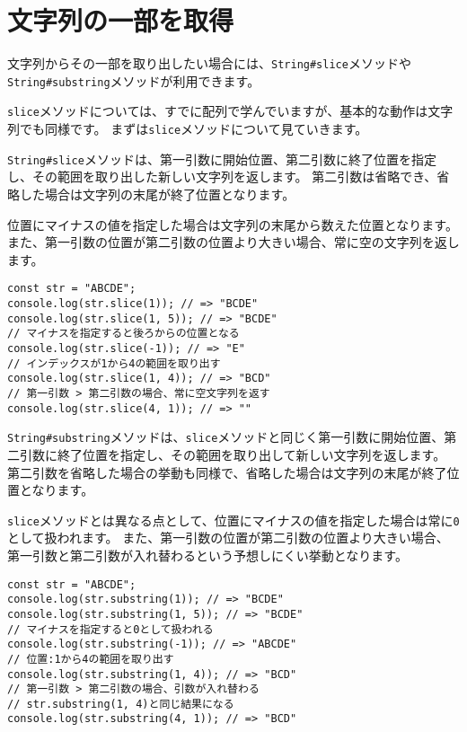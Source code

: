 \hypertarget{slice}{%
\section{文字列の一部を取得}\label{slice}}

文字列からその一部を取り出したい場合には、\texttt{String\#slice}メソッドや\texttt{String\#substring}メソッドが利用できます。

\texttt{slice}メソッドについては、すでに配列で学んでいますが、基本的な動作は文字列でも同様です。
まずは\texttt{slice}メソッドについて見ていきます。

\texttt{String\#slice}メソッドは、第一引数に開始位置、第二引数に終了位置を指定し、その範囲を取り出した新しい文字列を返します。
第二引数は省略でき、省略した場合は文字列の末尾が終了位置となります。

位置にマイナスの値を指定した場合は文字列の末尾から数えた位置となります。
また、第一引数の位置が第二引数の位置より大きい場合、常に空の文字列を返します。

\begin{lstlisting}
const str = "ABCDE";
console.log(str.slice(1)); // => "BCDE"
console.log(str.slice(1, 5)); // => "BCDE"
// マイナスを指定すると後ろからの位置となる
console.log(str.slice(-1)); // => "E"
// インデックスが1から4の範囲を取り出す
console.log(str.slice(1, 4)); // => "BCD"
// 第一引数 > 第二引数の場合、常に空文字列を返す
console.log(str.slice(4, 1)); // => ""
\end{lstlisting}

\texttt{String\#substring}メソッドは、\texttt{slice}メソッドと同じく第一引数に開始位置、第二引数に終了位置を指定し、その範囲を取り出して新しい文字列を返します。
第二引数を省略した場合の挙動も同様で、省略した場合は文字列の末尾が終了位置となります。

\texttt{slice}メソッドとは異なる点として、位置にマイナスの値を指定した場合は常に\texttt{0}として扱われます。
また、第一引数の位置が第二引数の位置より大きい場合、第一引数と第二引数が入れ替わるという予想しにくい挙動となります。

\begin{lstlisting}
const str = "ABCDE";
console.log(str.substring(1)); // => "BCDE"
console.log(str.substring(1, 5)); // => "BCDE"
// マイナスを指定すると0として扱われる
console.log(str.substring(-1)); // => "ABCDE"
// 位置:1から4の範囲を取り出す
console.log(str.substring(1, 4)); // => "BCD"
// 第一引数 > 第二引数の場合、引数が入れ替わる
// str.substring(1, 4)と同じ結果になる
console.log(str.substring(4, 1)); // => "BCD"
\end{lstlisting}

